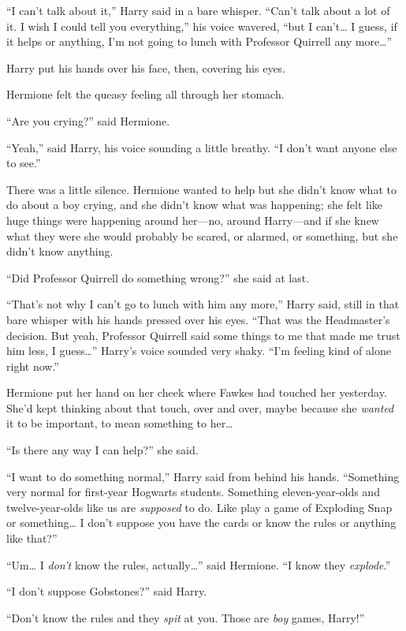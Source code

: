 ``I can't talk about it,'' Harry said in a bare whisper. ``Can't talk
about a lot of it. I wish I could tell you everything,'' his voice
wavered, ``but I can't\ldots{} I guess, if it helps or anything, I'm not
going to lunch with Professor Quirrell any more\ldots{}''

Harry put his hands over his face, then, covering his eyes.

Hermione felt the queasy feeling all through her stomach.

``Are you crying?'' said Hermione.

``Yeah,'' said Harry, his voice sounding a little breathy. ``I don't
want anyone else to see.''

There was a little silence. Hermione wanted to help but she didn't know
what to do about a boy crying, and she didn't know what was happening;
she felt like huge things were happening around her---no, around
Harry---and if she knew what they were she would probably be scared, or
alarmed, or something, but she didn't know anything.

``Did Professor Quirrell do something wrong?'' she said at last.

``That's not why I can't go to lunch with him any more,'' Harry said,
still in that bare whisper with his hands pressed over his eyes. ``That
was the Headmaster's decision. But yeah, Professor Quirrell said some
things to me that made me trust him less, I guess\ldots{}'' Harry's
voice sounded very shaky. ``I'm feeling kind of alone right now.''

Hermione put her hand on her cheek where Fawkes had touched her
yesterday. She'd kept thinking about that touch, over and over, maybe
because she \emph{wanted} it to be important, to mean something to
her\ldots{}

``Is there any way I can help?'' she said.

``I want to do something normal,'' Harry said from behind his hands.
``Something very normal for first-year Hogwarts students. Something
eleven-year-olds and twelve-year-olds like us are \emph{supposed} to do.
Like play a game of Exploding Snap or something\ldots{} I don't suppose
you have the cards or know the rules or anything like that?''

``Um\ldots{} I \emph{don't} know the rules, actually\ldots{}'' said
Hermione. ``I know they \emph{explode}.''

``I don't suppose Gobstones?'' said Harry.

``Don't know the rules and they \emph{spit} at you. Those are \emph{boy}
games, Harry!''


